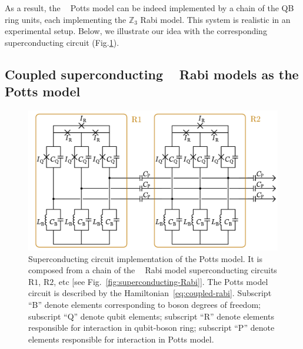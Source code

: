 \documentclass[reprint, aps, prx, amsmath, amssymb, longbibliography, superscriptaddress]{revtex4-2}
\DeclareMathOperator{\Zthree}{\mathbb{Z}_3}
\begin{document}
As a result, the $\Zthree$ Potts model can be indeed implemented by a chain of the QB ring units, each implementing the $\mathbb{Z}_3$ Rabi model. This system is realistic in an experimental setup. Below, we illustrate our idea with the corresponding superconducting circuit (Fig.\ref{fig:superconducting-potts}).

\subsection{Coupled superconducting \texorpdfstring{$\Zthree$}{Z3} Rabi models as the Potts model}


\begin{figure}[t]
    \includegraphics[width=\linewidth]{pics/SC_Potts_circuit_with_contours.pdf}
    \caption{Superconducting circuit implementation of the Potts model. It is composed from a chain of the $\Zthree$ Rabi model superconducting circuits $\mathrm{R1}$, $\mathrm{R2}$, etc [see Fig.~\ref{fig:superconducting-Rabi}]. The Potts model circuit is described by the Hamiltonian~\eqref{eq:coupled-rabi}. Subscript ``B'' denote elements corresponding to boson degrees of freedom; subscript ``Q'' denote qubit elements; subscript ``R'' denote elements responsible for interaction in qubit-boson ring; subscript ``P'' denote elements responsible for interaction in Potts model.}
    \label{fig:superconducting-potts}
\end{figure}
\end{document}
